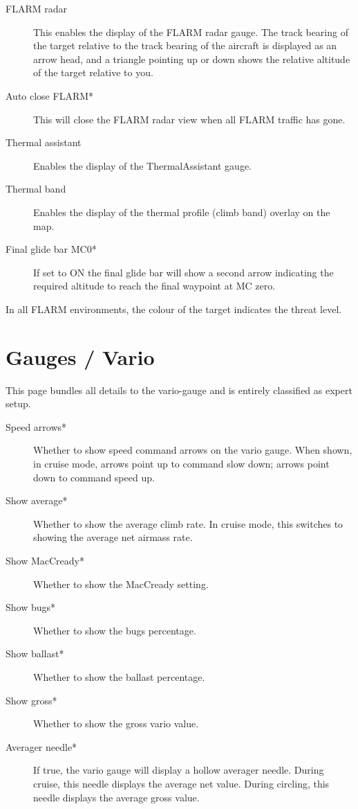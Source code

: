 \begin{description}
\item[FLARM radar]  \label{conf:flarmdisplay} This enables the display of the FLARM 
  radar gauge. The track bearing of the target relative to the track bearing of the 
  aircraft is displayed as an arrow head, and a triangle pointing up or down shows 
  the relative altitude of the target relative to you.
\\
\item[Auto close FLARM*]  This will close the FLARM radar view when all FLARM 
  traffic has gone.
\item[Thermal assistant] \label{conf:thermalassistant} Enables the display of the
  ThermalAssistant gauge.
\item[Thermal band] \label{conf:thermalband} Enables the display of the
  thermal profile (climb band) overlay on the map.
\item[Final glide bar MC0*]  If set to ON the final glide bar will show a second arrow 
  indicating the required altitude to reach the final waypoint at MC zero.
\end{description}
In all FLARM environments, the colour of the target indicates the threat level.


\section{Gauges / Vario}\label{sec:vario-gauge}

This page bundles all details to the vario-gauge and is entirely classified as expert setup.

\begin{description}
\item[Speed arrows*]  \label{conf:variogauge} Whether to show speed command 
  arrows on the vario gauge.
  When shown, in cruise mode, arrows point up to command slow down; arrows point down 
  to command speed up.
\item[Show average*]  Whether to show the average climb rate.  In cruise mode, this 
  switches to showing the average net airmass rate.
\item[Show MacCready*]  Whether to show the MacCready setting.
\item[Show bugs*]  Whether to show the bugs percentage.
\item[Show ballast*]  Whether to show the ballast percentage.
\item[Show gross*]  Whether to show the gross vario value.
\item[Averager needle*]  If true, the vario gauge will display a hollow averager
  needle. During cruise, this needle displays the average net value. During circling, 
  this needle displays the average gross value.
\end{description}

